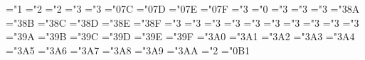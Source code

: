 { \mathchardef\hmsmallint="1
 \mathchardef\hmsqcup="2
 \mathchardef\hmsqcap="2
 \mathchardef\hmsqsubseteq="3
 \mathchardef\hmsqsupseteq="3
 \mathchardef\hmclubsuit="0\mthsy@@7C
 \mathchardef\hmdiamondsuit="0\mthsy@@7D
 \mathchardef\hmheartsuit="0\mthsy@@7E
 \mathchardef\hmspadesuit="0\mthsy@@7F
 \mathchardef\hmnotin="3
 \mathchardef\hmangle="0
 \mathchardef\hmdoteq="3
 \mathchardef\hmmodels="3
 \mathchardef\hmbowtie="3
 \mathchardef\hmcong="3\mthsy@@8A
 \mathchardef\hmhookleftarrow="3\mthsy@@8B
 \mathchardef\hmhookrightarrow="3\mthsy@@8C
 \mathchardef\hmlongleftarrow="3\mthsy@@8D
 \mathchardef\hmlongrightarrow="3\mthsy@@8E
 \mathchardef\hmLongleftarrow="3\mthsy@@8F
 \mathchardef\hmLongrightarrow="3
 \mathchardef\hmmapsto="3
 \mathchardef\hmlongmapsto="3
 \mathchardef\hmlongleftrightarrow="3
 \mathchardef\hmLongleftrightarrow="3
 \def\hmiff{\;\hmLongleftrightarrow\;}%
 \mathchardef\hmrightleftharpoons="3
 \mathchardef\hmnotless="3
 \mathchardef\hmnotleq="3
 \mathchardef\hmnotprec="3
 \mathchardef\hmnotpreceq="3
 \mathchardef\hmnotsubset="3\mthsy@@9A
 \mathchardef\hmnotsubseteq="3\mthsy@@9B
 \mathchardef\hmnotsqsubseteq="3\mthsy@@9C
 \mathchardef\hmnotgr="3\mthsy@@9D
 \mathchardef\hmnotgeq="3\mthsy@@9E
 \mathchardef\hmnotsucc="3\mthsy@@9F
 \mathchardef\hmnotsucceq="3\mthsy@@ A0
 \mathchardef\hmnotsupset="3\mthsy@@ A1
 \mathchardef\hmnotsupseteq="3\mthsy@@ A2
 \mathchardef\hmnotsqsupseteq="3\mthsy@@ A3
 \mathchardef\hmneq="3\mthsy@@ A4 \let\hmne=\hmneq
 \mathchardef\hmnotequiv="3\mthsy@@ A5
 \mathchardef\hmnotsim="3\mthsy@@ A6
 \mathchardef\hmnotsimeq="3\mthsy@@ A7
 \mathchardef\hmnotapprox="3\mthsy@@ A8
 \mathchardef\hmnotcong="3\mthsy@@ A9
 \mathchardef\hmnotasymp="3\mthsy@@ AA
 \mathchardef\hmangle="2
 \mathchardef\hmdigamma="0\mthsy@@ B1
 \def\hmyen{\ifmmode\mathchar"0\mthsy@@ B0 \else\mathhexbox\mthsy@@ B0\fi}%
 \def\hmgrave{\ifnum\fam=\m@ne\mathaccent"0\mthsy@@4A \else\@grave@\fi}%
 \def\hmacute{\ifnum\fam=\m@ne\mathaccent"0\mthsy@@4B \else\@acute@\fi}%
 \def\hmcheck{\ifnum\fam=\m@ne\mathaccent"0\mthsy@@4C \else\@check@\fi}%
 \def\hmbreve{\ifnum\fam=\m@ne\mathaccent"0\mthsy@@4D \else\@breve@\fi}%
 \def\hmbar{\ifnum\fam=\m@ne\mathaccent"0\mthsy@@4E \else\@bar@\fi}%
 \def\hmhat{\ifnum\fam=\m@ne\mathaccent"0\mthsy@@4F \else\@hat@\fi}%
 \def\hmdot{\ifnum\fam=\m@ne\mathaccent"0\mthsy@@50 \else\@dot@\fi}%
 \def\hmtilde{\ifnum\fam=\m@ne\mathaccent"0\mthsy@@51 \else\@tilde@\fi}%
}
